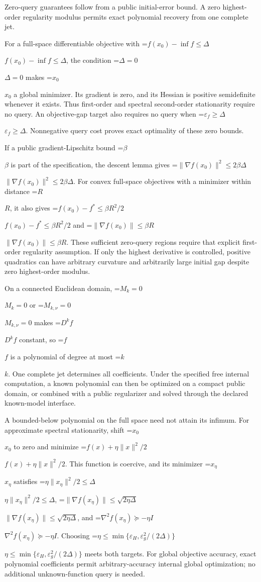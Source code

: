 \documentclass[10pt,a4paper]{article}
\newcommand{\AtlasMath}[1]{\par\begingroup\centering\setbox0=\hbox{$\displaystyle #1$}\ifdim\wd0>1.4\linewidth\typeout{ATLAS WIDE FORMULA: \the\wd0}\fi\ifdim\wd0>\linewidth\resizebox{\linewidth}{!}{\box0}\else\box0\fi\par\endgroup}
\newcommand{\AtlasInlineMath}[1]{\begingroup\setbox0=\hbox{$#1$}\ifdim\wd0>.4\linewidth\endgroup\AtlasMath{#1}\else\endgroup$#1$\fi}
\begin{document}
Zero-query guarantees follow from a public initial-error bound. A zero highest-order regularity modulus permits exact polynomial recovery from one complete jet.

For a full-space differentiable objective with \AtlasInlineMath{f(x_0)-\inf f\le\Delta}, the condition \AtlasInlineMath{\Delta=0} makes \AtlasInlineMath{x_0} a global minimizer. Its gradient is zero, and its Hessian is positive semidefinite whenever it exists. Thus first-order and spectral second-order stationarity require no query. An objective-gap target also requires no query when \AtlasInlineMath{\varepsilon_f\ge\Delta}. Nonnegative query cost proves exact optimality of these zero bounds.

If a public gradient-Lipschitz bound \AtlasInlineMath{\beta} is part of the specification, the descent lemma gives \AtlasInlineMath{\|\nabla f(x_0)\|^2\le2\beta\Delta}. For convex full-space objectives with a minimizer within distance \AtlasInlineMath{R}, it also gives \AtlasInlineMath{f(x_0)-f^*\le\beta R^2/2} and \AtlasInlineMath{\|\nabla f(x_0)\|\le\beta R}. These sufficient zero-query regions require that explicit first-order regularity assumption. If only the highest derivative is controlled, positive quadratics can have arbitrary curvature and arbitrarily large initial gap despite zero highest-order modulus.

On a connected Euclidean domain, \AtlasInlineMath{M_k=0} or \AtlasInlineMath{M_{k,\nu}=0} makes \AtlasInlineMath{D^kf} constant, so \AtlasInlineMath{f} is a polynomial of degree at most \AtlasInlineMath{k}. One complete jet determines all coefficients. Under the specified free internal computation, a known polynomial can then be optimized on a compact public domain, or combined with a public regularizer and solved through the declared known-model interface.

A bounded-below polynomial on the full space need not attain its infimum. For approximate spectral stationarity, shift \AtlasInlineMath{x_0} to zero and minimize \AtlasInlineMath{f(x)+\eta\|x\|^2/2}. This function is coercive, and its minimizer \AtlasInlineMath{x_\eta} satisfies \AtlasInlineMath{\eta\|x_\eta\|^2/2\le\Delta}, \AtlasInlineMath{\|\nabla f(x_\eta)\|\le\sqrt{2\eta\Delta}}, and \AtlasInlineMath{\nabla^2f(x_\eta)\succeq-\eta I}. Choosing \AtlasInlineMath{\eta\le\min\{\varepsilon_H,\varepsilon_g^2/(2\Delta)\}} meets both targets. For global objective accuracy, exact polynomial coefficients permit arbitrary-accuracy internal global optimization; no additional unknown-function query is needed.
\end{document}
